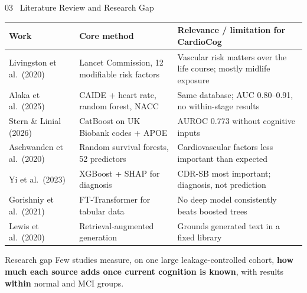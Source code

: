 \documentclass[aspectratio=169,11pt]{beamer}
\begin{document}
\begin{frame}{03 \textbar\ Literature Review and Research Gap}
\scriptsize
\begin{tabularx}{\textwidth}{@{}p{3.1cm}p{4.2cm}Y@{}}
\toprule
Work & Core method & Relevance / limitation for CardioCog \\
\midrule
Livingston et al.\ (2020) & Lancet Commission, 12 modifiable risk factors & Vascular risk matters over the life course; mostly midlife exposure \\
Alaka et al.\ (2025) & CAIDE + heart rate, random forest, NACC & Same database; AUC 0.80--0.91, no within-stage results \\
Stern \& Linial (2026) & CatBoost on UK Biobank codes + APOE & AUROC 0.773 without cognitive inputs \\
Aschwanden et al.\ (2020) & Random survival forests, 52 predictors & Cardiovascular factors less important than expected \\
Yi et al.\ (2023) & XGBoost + SHAP for diagnosis & CDR-SB most important; diagnosis, not prediction \\
Gorishniy et al.\ (2021) & FT-Transformer for tabular data & No deep model consistently beats boosted trees \\
Lewis et al.\ (2020) & Retrieval-augmented generation & Grounds generated text in a fixed library \\
\bottomrule
\end{tabularx}
\begin{block}{Research gap}
\small Few studies measure, on one large leakage-controlled cohort, \textbf{how much each source adds once current cognition is known}, with results \textbf{within} normal and MCI groups.
\end{block}
\end{frame}
\end{document}
